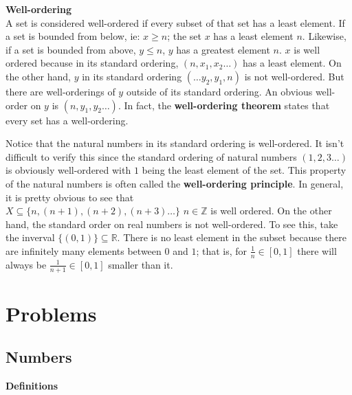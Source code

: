 \documentclass[a4paper,12pt]{article}
\begin{document}
\textbf{Well-ordering}\medskip\\
\hspace*{\parindent}A set is considered well-ordered if every subset of that set has a least element. If a set is bounded from below, ie: $x \geq n$; the set $x$ has a least element $n$. Likewise, if a set is bounded from above, $y \leq n$, $y$ has a greatest element $n$. $x$ is well ordered because in its standard ordering, $(n, x_1, x_2 \dots)$ has a least element. On the other hand, $y$ in its standard ordering $(\dots y_2, y_1, n)$ is not well-ordered. But there are well-orderings of $y$ outside of its standard ordering. An obvious well-order on $y$ is $(n, y_1, y_2 \dots)$. In fact, the \textbf{well-ordering theorem} states that every set has a well-ordering.\medskip

Notice that the natural numbers in its standard ordering is well-ordered. It isn't difficult to verify this since the standard ordering of natural numbers $(1, 2, 3 \dots)$ is obviously well-ordered with $1$ being the least element of the set. This property of the natural numbers is often called the \textbf{well-ordering principle}. In general, it is pretty obvious to see that \\
$X \subseteq \{n, (n+1), (n+2), (n+3)\dots \}$ $n \in \mathbb{Z}$ is well ordered.
On the other hand, the standard order on real numbers is not well-ordered. To see this, take the inverval $\{(0, 1)\} \subseteq \mathbb{R}$. There is no least element in the subset because there are infinitely many elements between $0$ and $1$; that is, for $\frac{1}{n} \in [0, 1]$ there will always be $\frac{1}{n+1} \in [0, 1]$ smaller than it.

\newpage
\section{Problems}

\newpage

\subsection{Numbers}
\textbf{Definitions}\bigskip\\
\bigskip\\
\bigskip\\
\bigskip\\
\medskip
\end{document}
